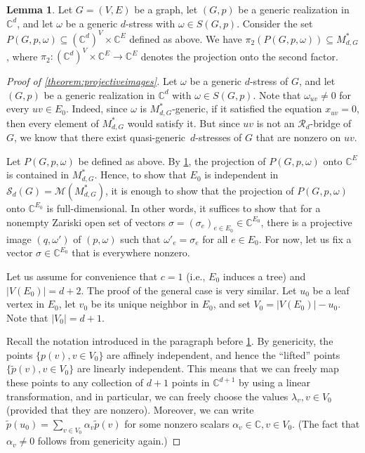 \documentclass[11pt,a4paper,dvipsnames]{scrartcl}
\theoremstyle{definition}
\newtheorem{lemma}[theorem]{Lemma}
\newcommand{\CC}{\mathbb{C}}
\newcommand{\algmat}[1]{\mathcal{M}(#1)}
\newcommand{\stressmatroid}[2]{\mathcal{S}_{#1}(#2)}
\newcommand{\quasigen}{quasi-generic}
\begin{document}
\begin{lemma}\label{lemma:projectivetechnical}
    Let $G = (V,E)$ be a graph, let $(G,p)$ be a generic realization in $\CC^d$, and let $\omega$ be a generic $d$-stress with $\omega \in S(G,p)$. Consider the set $P(G,p,\omega) \subseteq (\CC^{d})^V \times \CC^E $ defined as above. %
    We have $\pi_2(P(G,p,\omega)) \subseteq M_{d,G}^*$, where $\pi_2 : (\CC^{d})^V \times \CC^E \rightarrow \CC^{E}$ denotes the projection onto the second factor.
\end{lemma}


\begin{proof}[Proof of \cref{theorem:projectiveimages}]
    Let $\omega$ be a generic $d$-stress of $G$, and let $(G,p)$ be a generic realization in $\CC^d$ with $\omega \in S(G,p)$. Note that $\omega_{uv} \neq 0$ for every $uv \in E_0$. Indeed, since $\omega$ is $M_{d,G}^*$-generic, if it satisfied the equation $x_{uv} = 0$, then every element of $M_{d,G}^*$ would satisfy it. But since $uv$ is not an $\mathcal{R}_d$-bridge of $G$, we know that there exist \quasigen\ $d$-stresses of $G$ that are nonzero on $uv$. 
    
    Let $P(G,p,\omega)$ be defined as above. By \cref{lemma:projectivetechnical}, the projection of $P(G,p,\omega)$ onto $\CC^E$ is contained in $M_{d,G}^*$. Hence, to show that $E_0$ is independent in $\stressmatroid{d}{G} = \algmat{M_{d,G}^*}$, it is enough to show that the projection of $P(G,p,\omega)$ onto $\CC^{E_0}$ is full-dimensional. In other words, it suffices to show that for a nonempty Zariski open set of vectors $\sigma = {(\sigma_e)}_{e \in E_0} \in \CC^{E_0}$, there is a projective image $(q,\omega')$ of $(p,\omega)$ such that $\omega'_e = \sigma_e$ for all $e \in E_0$. For now, let us fix a vector $\sigma \in \CC^{E_0}$ that is everywhere nonzero.
    
    Let us assume for convenience that $c=1$ (i.e., $E_0$ induces a tree) and $|V(E_0)| = d+2$. The proof of the general case is very similar. Let $u_0$ be a leaf vertex in $E_0$, let $v_0$ be its unique neighbor in $E_0$, and set $V_0 = |V(E_0)| - u_0$. Note that $|V_0| = d+1$. 
    
    Recall the notation introduced in the paragraph before \cref{lemma:projectivetechnical}. By genericity, the points $\{p(v), v \in V_0\}$ are affinely independent, and hence the ``lifted'' points $\{\tilde{p}(v), v\in V_0\}$ are linearly independent. This means that we can freely map these points to any collection of $d+1$ points in $\CC^{d+1}$ by using a linear transformation, and in particular, we can freely choose the values $\lambda_v, v \in V_0$ (provided that they are nonzero). Moreover, we can write $\tilde{p}(u_0) = \sum_{v \in V_0}\alpha_v \tilde{p}(v)$ for some nonzero scalars $\alpha_v \in \CC, v \in V_0$. (The fact that $\alpha_v \neq 0$ follows from genericity again.) 
    

\end{proof}
\end{document}
